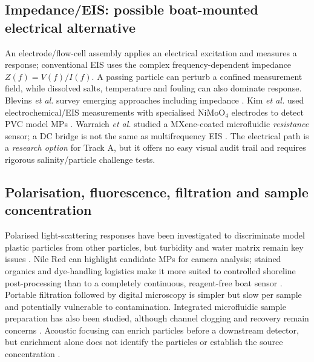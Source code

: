 \documentclass[10pt,a4paper]{article}
\begin{document}
\subsection{Impedance/EIS: possible boat-mounted electrical alternative}
An electrode/flow-cell assembly applies an electrical excitation and measures a response; conventional EIS uses the complex frequency-dependent impedance $Z(f)=V(f)/I(f)$. A passing particle can perturb a confined measurement field, while dissolved salts, temperature and fouling can also dominate response. Blevins \emph{et al.} survey emerging approaches including impedance \cite{Blevins2021}. Kim \emph{et al.} used electrochemical/EIS measurements with specialised NiMoO$_4$ electrodes to detect PVC model MPs \cite{Kim2024}. Warraich \emph{et al.} studied a MXene-coated microfluidic \emph{resistance} sensor; a DC bridge is not the same as multifrequency EIS \cite{Warraich2025}. The electrical path is a \emph{research option} for Track A, but it offers no easy visual audit trail and requires rigorous salinity/particle challenge tests.

\subsection{Polarisation, fluorescence, filtration and sample concentration}
Polarised light-scattering responses have been investigated to discriminate model plastic particles from other particles, but turbidity and water matrix remain key issues \cite{Polarized2021}. Nile Red can highlight candidate MPs for camera analysis; stained organics and dye-handling logistics make it more suited to controlled shoreline post-processing than to a completely continuous, reagent-free boat sensor \cite{ErniCassola2017,Minor2023}. Portable filtration followed by digital microscopy is simpler but slow per sample and potentially vulnerable to contamination. Integrated microfluidic sample preparation has also been studied, although channel clogging and recovery remain concerns \cite{Zhang2023}. Acoustic focusing can enrich particles before a downstream detector, but enrichment alone does not identify the particles or establish the source concentration \cite{Ohori2025}.
\end{document}

